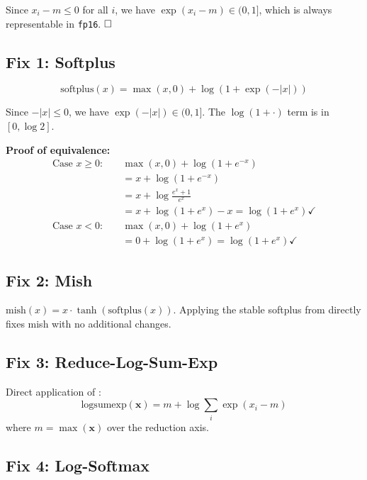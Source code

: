 \documentclass[10pt,twocolumn]{article}
\newcommand{\fp}{\texttt{fp16}}
\begin{document}
Since $x_i - m \leq 0$ for all $i$, we have
$\exp(x_i - m) \in (0, 1]$, which is always representable in \fp{}.
$\hfill\square$

\subsection{Fix 1: Softplus}
\label{sec:fix_softplus}

\begin{equation}
  \text{softplus}(x) = \max(x, 0) + \log(1 + \exp(-|x|))
  \label{eq:stable_softplus}
\end{equation}

Since $-|x| \leq 0$, we have $\exp(-|x|) \in (0, 1]$.
The $\log(1 + \cdot)$ term is in $[0, \log 2]$.

\textbf{Proof of equivalence:}
\begin{align*}
\text{Case } x \geq 0: \quad &\max(x,0) + \log(1 + e^{-x}) \\
  &= x + \log(1 + e^{-x}) \\
  &= x + \log\frac{e^x + 1}{e^x} \\
  &= x + \log(1 + e^x) - x = \log(1 + e^x) \checkmark \\
\text{Case } x < 0: \quad &\max(x,0) + \log(1 + e^{x}) \\
  &= 0 + \log(1 + e^x) = \log(1 + e^x) \checkmark
\end{align*}

\subsection{Fix 2: Mish}

$\text{mish}(x) = x \cdot \tanh(\text{softplus}(x))$.  Applying
the stable softplus from  directly fixes
mish with no additional changes.

\subsection{Fix 3: Reduce-Log-Sum-Exp}

Direct application of :
\begin{equation}
  \text{logsumexp}(\mathbf{x}) = m + \log \sum_{i} \exp(x_i - m)
  \label{eq:stable_lse}
\end{equation}
where $m = \max(\mathbf{x})$ over the reduction axis.

\subsection{Fix 4: Log-Softmax}
\label{sec:fix_logsoftmax}
\end{document}
